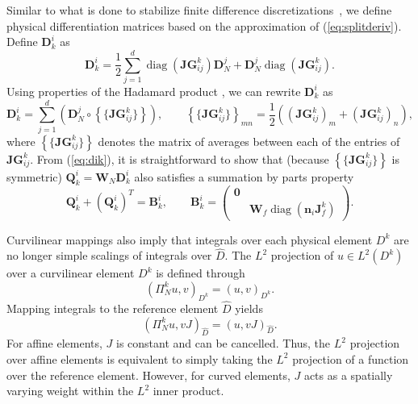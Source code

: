 \documentclass[preprint,10pt]{article}
\theoremstyle{definition}
\theoremstyle{lemma}
\theoremstyle{theorem}
\theoremstyle{assumption}
\DeclareMathOperator{\diag}{diag}
\renewcommand{\hat}{\widehat}
\newcommand{\LRp}[1]{\left( #1 \right)}
\newcommand{\LRc}[1]{\left\{ #1 \right\}}
\newcommand{\avg}[1] {\ensuremath{\LRc{\!\{#1\}\!}}}
\begin{document}
{Similar to what is done to stabilize finite difference discretizations~\cite{nordstrom2006cfdf}, we define physical differentiation matrices based on the approximation of (\ref{eq:splitderiv}).  Define $\bm{D}^i_k$ as
\[
\bm{D}^i_k = \frac12 \sum_{j=1}^d \diag\LRp{\bm{JG}^k_{ij}}\bm{D}^j_N + \bm{D}^j_N\diag\LRp{\bm{JG}^k_{ij}}.
\]
Using properties of the Hadamard product \cite{horn2012matrix}, we can rewrite $\bm{D}^i_k$ as 
\begin{equation}
\bm{D}^i_k = \sum_{j=1}^d \LRp{\bm{D}^j_N \circ \avg{\bm{JG}^k_{ij}}}, \qquad \avg{\bm{JG}^k_{ij}}_{mn} = \frac{1}{2}\LRp{\LRp{\bm{JG}^k_{ij}}_m + \LRp{\bm{JG}^k_{ij}}_n},
\label{eq:dik}
\end{equation}
where $\avg{\bm{JG}^k_{ij}}$ denotes the matrix of averages between each of the entries of $\bm{JG}^k_{ij}$.  From (\ref{eq:dik}), it is straightforward to show that (because $\avg{\bm{JG}^k_{ij}}$ is symmetric) $\bm{Q}^i_k = \bm{W}_N\bm{D}^i_k$ also satisfies a summation by parts property
\begin{equation}
\bm{Q}^i_k + \LRp{\bm{Q}^i_k}^T = \bm{B}^i_k, \qquad \bm{B}^i_k = 
\LRp{\begin{array}{cc}
\bm{0}&\\
& \bm{W}_f \diag\LRp{\bm{n}_i\bm{J}^k_f}
\end{array}}.
\label{eq:sbpk}
\end{equation}

Curvilinear mappings also imply that integrals over each physical element $D^k$ are no longer simple scalings of integrals over $\hat{D}$.  The $L^2$ projection of $u\in L^2\LRp{D^k}$ over a curvilinear element $D^k$ is defined through 
\begin{equation}
\LRp{\Pi^k_N u,v}_{D^k} = \LRp{u,v}_{D^k}.
\label{eq:l2curv}
\end{equation}
Mapping integrals to the reference element $\hat{D}$ yields
\begin{equation}
\LRp{\Pi^k_N u,v J}_{\hat{D}} = \LRp{u,vJ}_{\hat{D}}.
\label{eq:l2curvmap}
\end{equation}
For affine elements, $J$ is constant and can be cancelled.  Thus, the $L^2$ projection over affine elements is equivalent to simply taking the $L^2$ projection of a function over the reference element.  However, for curved elements, $J$ acts as a spatially varying weight within the $L^2$ inner product.  

}
\end{document}
